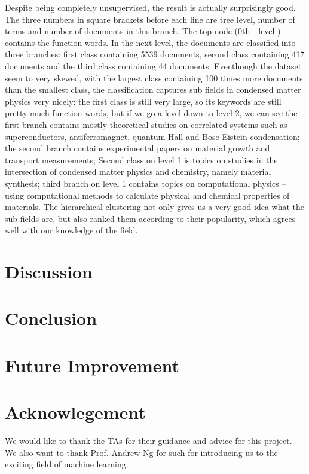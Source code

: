 \documentclass[DIV=calc, paper=a4, fontsize=11pt, twocolumn]{scrartcl}	 %
\begin{document}
Despite being completely unsupervised, the result is actually surprisingly good. The three numbers in square brackets before each line are tree level, number of terms and number of documents in this branch. The top node (0th - level ) contains the function words. In the next level, the documents are classified into three branches: first class containing 5539 documents, second class containing 417 documents and the third class containing 44 documents. Eventhough the dataset seem to very skewed, with the largest class containing 100 times more documents than the smallest class, the classification captures sub fields in condensed matter physics very nicely: the first class is still very large, so its keywords are still pretty much function words, but if we go a level down to level 2, we can see the first branch contains mostly theoretical studies on correlated systems such as superconductors, antiferromagnet, quantum Hall and Bose Eistein condensation; the second branch contains experimental papers on material growth and transport measurements; Second class on level 1 is topics on studies in the intersection of condensed matter physics and chemistry, namely material synthesis; third branch on level 1 contains topics on computational physics -- using computational methods to calculate physical and chemical properties of materials. The hierarchical clustering not only gives us a very good idea what the sub fields are, but also ranked them according to their popularity, which agrees well with our knowledge of the field.      

\section*{Discussion}
\section*{Conclusion}
\section*{Future Improvement}
\section*{Acknowlegement}
We would like to thank the TAs for their guidance and advice for this project. We also want to thank Prof. Andrew Ng for such for introducing us to the exciting field of machine learning.  
\end{document}
